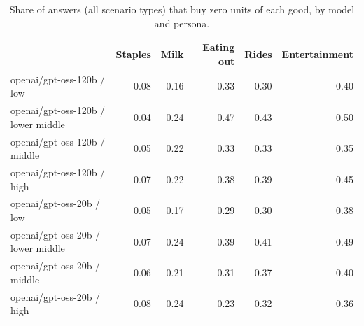\begin{table}[!htbp]\centering\small
\caption{Share of answers (all scenario types) that buy zero units of each good, by model and persona.}\label{tab:zero_share}
\begin{tabular}{lrrrrr}
\hline
 & Staples & Milk & Eating out & Rides & Entertainment \\ \hline
openai/gpt-oss-120b / low & 0.08 & 0.16 & 0.33 & 0.30 & 0.40 \\
openai/gpt-oss-120b / lower middle & 0.04 & 0.24 & 0.47 & 0.43 & 0.50 \\
openai/gpt-oss-120b / middle & 0.05 & 0.22 & 0.33 & 0.33 & 0.35 \\
openai/gpt-oss-120b / high & 0.07 & 0.22 & 0.38 & 0.39 & 0.45 \\
openai/gpt-oss-20b / low & 0.05 & 0.17 & 0.29 & 0.30 & 0.38 \\
openai/gpt-oss-20b / lower middle & 0.07 & 0.24 & 0.39 & 0.41 & 0.49 \\
openai/gpt-oss-20b / middle & 0.06 & 0.21 & 0.31 & 0.37 & 0.40 \\
openai/gpt-oss-20b / high & 0.08 & 0.24 & 0.23 & 0.32 & 0.36 \\
\hline
\end{tabular}
\end{table}